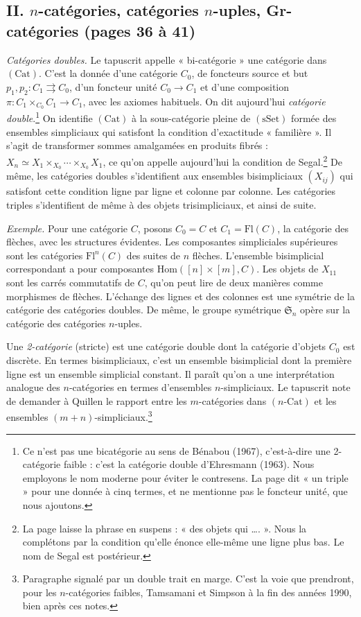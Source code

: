 \documentclass[11pt,a4paper]{article}
\begin{document}
\subsection*{II. $n$-catégories, catégories $n$-uples, Gr-catégories (pages 36 à 41)}

\emph{Catégories doubles.} Le tapuscrit appelle « bi-catégorie » une catégorie
dans $(\mathrm{Cat})$. C'est la donnée d'une catégorie $C_0$, de foncteurs
source et but $p_1, p_2 : C_1 \rightrightarrows C_0$, d'un foncteur unité $C_0
\to C_1$ et d'une composition $\pi : C_1 \times_{C_0} C_1 \to C_1$, avec les
axiomes habituels. On dit aujourd'hui \emph{catégorie double}.\footnote{Ce n'est
pas une bicatégorie au sens de Bénabou (1967), c'est-à-dire une 2-catégorie
faible : c'est la catégorie double d'Ehresmann (1963). Nous employons le nom
moderne pour éviter le contresens. La page dit « un triple » pour une donnée à
cinq termes, et ne mentionne pas le foncteur unité, que nous ajoutons.} On
identifie $(\mathrm{Cat})$ à la sous-catégorie pleine de $(\mathrm{sSet})$
formée des ensembles simpliciaux qui satisfont la condition d'exactitude
« familière ». Il s'agit de transformer sommes amalgamées en produits fibrés :
$X_n \simeq X_1 \times_{X_0} \cdots \times_{X_0} X_1$, ce qu'on appelle
aujourd'hui la condition de Segal.\footnote{La page laisse la phrase en suspens
: « des objets qui …. ». Nous la complétons par la condition qu'elle énonce
elle-même une ligne plus bas. Le nom de Segal est postérieur.} De même, les
catégories doubles s'identifient aux ensembles bisimpliciaux $(X_{ij})$ qui
satisfont cette condition ligne par ligne et colonne par colonne. Les
catégories triples s'identifient de même à des objets trisimpliciaux, et
ainsi de suite.

\emph{Exemple.} Pour une catégorie $C$, posons $C_0 = C$ et $C_1 =
\mathrm{Fl}(C)$, la catégorie des flèches, avec les structures évidentes. Les
composantes simpliciales supérieures sont les catégories $\mathrm{Fl}^{n}(C)$
des suites de $n$ flèches. L'ensemble bisimplicial correspondant a pour
composantes $\mathrm{Hom}([n] \times [m], C)$. Les objets de $X_{11}$ sont les
carrés commutatifs de $C$, qu'on peut lire de deux manières comme morphismes de
flèches. L'échange des lignes et des colonnes est une symétrie de la catégorie
des catégories doubles. De même, le groupe symétrique $\mathfrak{S}_n$ opère
sur la catégorie des catégories $n$-uples.

Une \emph{2-catégorie} (stricte) est une catégorie double dont la catégorie
d'objets $C_0$ est discrète. En termes bisimpliciaux, c'est un ensemble
bisimplicial dont la première ligne est un ensemble simplicial constant. Il
paraît qu'on a une interprétation analogue des $n$-catégories en termes
d'ensembles $n$-simpliciaux. Le tapuscrit note de demander à Quillen le rapport
entre les $m$-catégories dans $(n\text{-Cat})$ et les ensembles
$(m+n)$-simpliciaux.\footnote{Paragraphe signalé par un double trait en marge.
C'est la voie que prendront, pour les $n$-catégories faibles, Tamsamani et
Simpson à la fin des années 1990, bien après ces notes.}
\end{document}
